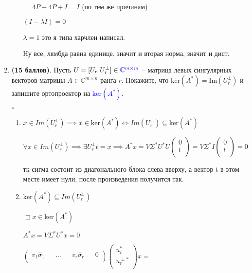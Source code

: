\documentclass[a4paper, 11pt]{article}
\newcommand{\prob}[1]{\item \textbf{(#1 баллов)}.}
\begin{document}
\begin{enumerate}
\begin{enumerate}
			$= 4P - 4P + I = I$ (по тем же причинам)

			$(I - \lambda I) = 0$

			$\lambda = 1$ это я типа харчлен написал.

			Ну все, лямбда равна единице, значит и вторая норма, значит и дист.

	\end{enumerate}
	\prob{15}
	Пусть $U = [U_r\ U_r^\perp ]\in\textcolor{blue}{\mathbb{C}^{m\times m}}$ -- матрица левых сингулярных векторов матрицы $A\in \mathbb{C}^{m\times n}$ ранга $r$. Покажите, что $\mathrm{ker}(A^*) = \mathrm{Im}(U_r^\perp)$ и запишите ортопроектор на \textcolor{blue}{$\mathrm{ker}(A^*)$}.
	
	
		$\square$

		\begin{enumerate}
				\item $x \in Im(U_r^\perp) \implies x \in \mathrm{ker}(A^*) \Longleftrightarrow Im(U_r^\perp) \subseteq \mathrm{ker}(A^*)$

				$\forall x \in Im(U_r^\perp) \implies \exists U_r^\perp t = x \implies A^* x = V \Sigma^* U^* U \begin{pmatrix}
					0 \\
					t \\
				\end{pmatrix} = V \Sigma^* I \begin{pmatrix}
				0 \\
				t \\
			\end{pmatrix} = 0$

			тк сигма состоит из диагонального блока слева вверху, а вектор t в этом месте имеет нули, после произведения получится так.

			\item	$ \mathrm{ker}(A^*) \subseteq   Im(U_r^\perp)$
			
				$\sqsupset x \in \mathrm{ker}(A^*)$
				
					$A^* x = V \Sigma^* U^* x = 0$
					
					$\begin{pmatrix}
						v_1 \bar \sigma_1 && \dots && v_r \bar \sigma_r && 0  \\ 
					\end{pmatrix} \begin{pmatrix}
					u_r^* \\ 
					u_r^{\perp*} \\
				\end{pmatrix} x =$
			

\end{enumerate}
\end{enumerate}
\end{document}
